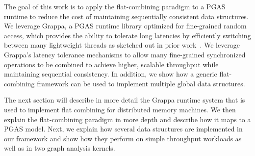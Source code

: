 The goal of this work is to apply the flat-combining paradigm to a PGAS runtime to reduce the cost of maintaining sequentially consistent data structures.
We leverage Grappa, a PGAS runtime library optimized for fine-grained random access, which provides the ability to tolerate long latencies by efficiently switching between many lightweight threads as sketched out in prior work~\cite{Nelson:hotpar11-real}.
We leverage Grappa's latency tolerance mechanisms to allow many fine-grained synchronized operations to be combined to achieve higher, scalable throughput while maintaining sequential consistency.
In addition, we show how a generic flat-combining framework can be used to implement multiple global data structures.

The next section will describe in more detail the Grappa runtime system that is used to implement flat combining for distributed memory machines. We then explain the flat-combining paradigm in more depth and describe how it maps to a PGAS model. Next, we explain how several data structures are implemented in our framework and show how they perform on simple throughput workloads as well as in two graph analysis kernels.
